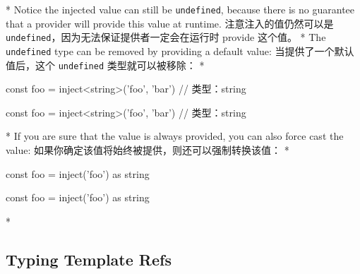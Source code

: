 \begin{paracol}{2}
\begin{codeTs}
\end{codeTs}
\switchcolumn[0]*%
Notice the injected value can still be \texttt{undefined}, because there
is no guarantee that a provider will provide this value at runtime.
\switchcolumn
注意注入的值仍然可以是
\texttt{undefined}，因为无法保证提供者一定会在运行时 provide 这个值。
\switchcolumn[0]*%
The \texttt{undefined} type can be removed by providing a default value:
\switchcolumn
当提供了一个默认值后，这个 \texttt{undefined} 类型就可以被移除：
\switchcolumn[0]*%
\begin{codeTs}
const foo = inject<string>('foo', 'bar') // 类型：string
\end{codeTs}
\switchcolumn
\begin{codeTs}
const foo = inject<string>('foo', 'bar') // 类型：string
\end{codeTs}
\switchcolumn[0]*%
If you are sure that the value is always provided, you can also force
cast the value:
\switchcolumn
如果你确定该值将始终被提供，则还可以强制转换该值：
\switchcolumn[0]*%
\begin{codeTs}
const foo = inject('foo') as string
\end{codeTs}
\switchcolumn
\begin{codeTs}
const foo = inject('foo') as string
\end{codeTs}
\switchcolumn[0]*%
\subsection{Typing Template Refs}
\switchcolumn

\end{paracol}
